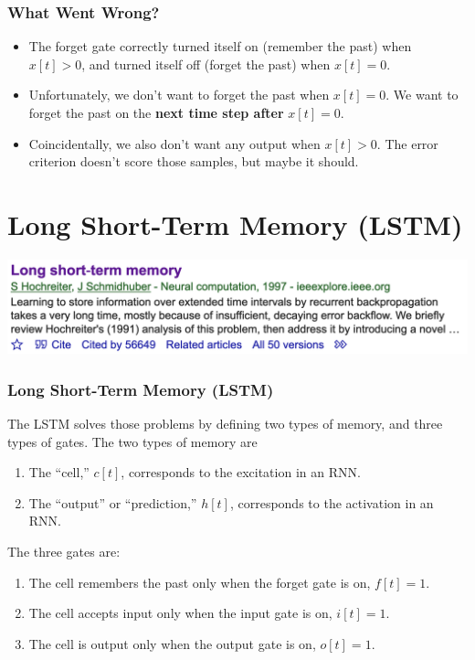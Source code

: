 \documentclass{beamer}
\begin{document}
\begin{frame}
  \frametitle{What Went Wrong?}
  \begin{itemize}
    \item The forget gate correctly turned itself on (remember the
      past) when $x[t]>0$, and turned itself off (forget the past)
      when $x[t]=0$.
    \item Unfortunately, we don't want to forget the past when
      $x[t]=0$.  We want to forget the past on the {\bf next time step
      after} $x[t]=0$.
    \item Coincidentally, we also don't want any output when $x[t]>0$.
      The error criterion doesn't score those samples, but maybe it
      should.
  \end{itemize}
\end{frame}

\section[LSTM]{Long Short-Term Memory (LSTM)}
\setcounter{subsection}{1}

\begin{frame}
  \centerline{\includegraphics[width=\textwidth]{lstm_citation.png}}
\end{frame}

\begin{frame}
  \frametitle{Long Short-Term Memory (LSTM)}

  The LSTM solves those problems by defining two types of memory, and
  three types of gates.  The two types of memory are
  \begin{enumerate}
  \item The ``cell,'' $c[t]$, corresponds to the excitation in an RNN.
  \item The ``output'' or ``prediction,'' $h[t]$, corresponds to the activation in an RNN.
  \end{enumerate}
  The three gates are:
  \begin{enumerate}
  \item The cell remembers the past only when the forget gate is on, $f[t]=1$.
  \item The cell accepts input only when the input gate is on, $i[t]=1$.
  \item The cell is output only when the output gate is on, $o[t]=1$.
  \end{enumerate}
\end{frame}
  
\end{document}
